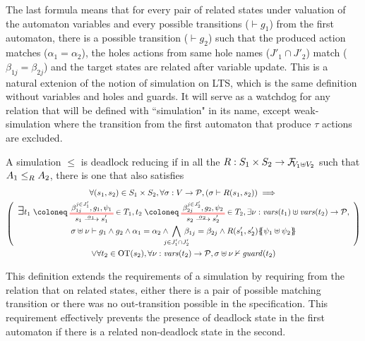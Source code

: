 \documentclass{article}
\begin{document}
The last formula means that for every pair of related states under valuation of the automaton variables and every possible transitions (\(\vdash g_1\)) from the first automaton, there is a possible transition (\(\vdash g_2\)) such that the produced action matches (\(\alpha_1 = \alpha_2\)), the holes actions from same hole names (\(J'_1 \cap J'_2\)) match (\(\beta_{1j} = \beta_{2j}\)) and the target states are related after variable update.
This is a natural extenion of the notion of simulation on LTS, which is the same definition without variables and holes and guards.
It will serve as a watchdog for any relation that will be defined with ``simulation" in its name, except weak-simulation where the transition from the first automaton that produce \(\tau\) actions are excluded.

\begin{defi}
A simulation \(\leq\) is deadlock reducing if in all the \(R: S_1 \times S_2 \to \rformulae[V_1 \uplus V_2]\) such that \(\wrel{A_1}{A_2}{R}\), there is one that also satisfies
\begin{multline*}
	\forall \mpar{s_1, s_2} \in S_1 \times S_2, \forall \sigma: V \to \values, \mpar{\sigma \vdash R\mpar{s_1, s_2}} \implies \\
	\mpar{\everymath{\displaystyle}\begin{array}{c}
		\bigsymb{\exists} t_1 \defobject \OTx{1}{}{1}{1} \in T_1, t_2 \defobject \OTx{2}{}{2}{2} \in T_2, \exists \nu: \fvars{t_1} \uplus \fvars{t_2} \to \values, \\
		\sigma \uplus \nu \vdash g_1 \wedge g_2 \wedge \alpha_1 = \alpha_2 \wedge \bigwedge_\subbox{j \in J'_1 \cap J'_2} \beta_{1j} = \beta_{2j} \wedge R\mpar{s'_1, s'_2}\psubst{\psi_1 \uplus \psi_2}
	\end{array}} \\
	\vee \forall t_2 \in \fOT{s_2}, \forall \nu: \fvars{t_2} \to \values, \sigma \uplus \nu \nvdash \fguard{t_2}
\end{multline*}
\end{defi}
This definition extends the requirements of a simulation by requiring from the relation that on related states, either there is a pair of possible matching transition or there was no out-transition possible in the specification.
This requirement effectively prevents the presence of deadlock state in the first automaton if there is a related non-deadlock state in the second.

\end{document}
